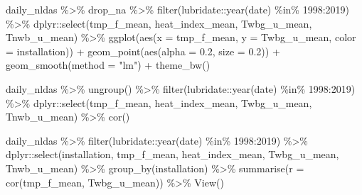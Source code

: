 \documentclass[
]{article}
\newenvironment{Shaded}{\begin{snugshade}}{\end{snugshade}}
\newcommand{\AttributeTok}[1]{\textcolor[rgb]{0.77,0.63,0.00}{#1}}
\newcommand{\DecValTok}[1]{\textcolor[rgb]{0.00,0.00,0.81}{#1}}
\newcommand{\FloatTok}[1]{\textcolor[rgb]{0.00,0.00,0.81}{#1}}
\newcommand{\FunctionTok}[1]{\textcolor[rgb]{0.00,0.00,0.00}{#1}}
\newcommand{\NormalTok}[1]{#1}
\newcommand{\SpecialCharTok}[1]{\textcolor[rgb]{0.00,0.00,0.00}{#1}}
\newcommand{\StringTok}[1]{\textcolor[rgb]{0.31,0.60,0.02}{#1}}
\begin{document}
\begin{Shaded}
\begin{Highlighting}[]
\NormalTok{daily\_nldas }\SpecialCharTok{\%\textgreater{}\%} 
\NormalTok{  drop\_na }\SpecialCharTok{\%\textgreater{}\%} 
  \FunctionTok{filter}\NormalTok{(lubridate}\SpecialCharTok{::}\FunctionTok{year}\NormalTok{(date) }\SpecialCharTok{\%in\%} \DecValTok{1998}\SpecialCharTok{:}\DecValTok{2019}\NormalTok{) }\SpecialCharTok{\%\textgreater{}\%} 
\NormalTok{  dplyr}\SpecialCharTok{::}\FunctionTok{select}\NormalTok{(tmp\_f\_mean, heat\_index\_mean, Twbg\_u\_mean, Tnwb\_u\_mean) }\SpecialCharTok{\%\textgreater{}\%} 
  \FunctionTok{ggplot}\NormalTok{(}\FunctionTok{aes}\NormalTok{(}\AttributeTok{x =}\NormalTok{ tmp\_f\_mean, }\AttributeTok{y =}\NormalTok{ Twbg\_u\_mean, }\AttributeTok{color =}\NormalTok{ installation)) }\SpecialCharTok{+}
    \FunctionTok{geom\_point}\NormalTok{(}\FunctionTok{aes}\NormalTok{(}\AttributeTok{alpha =} \FloatTok{0.2}\NormalTok{, }\AttributeTok{size =} \FloatTok{0.2}\NormalTok{)) }\SpecialCharTok{+}
    \FunctionTok{geom\_smooth}\NormalTok{(}\AttributeTok{method =} \StringTok{"lm"}\NormalTok{) }\SpecialCharTok{+}
    \FunctionTok{theme\_bw}\NormalTok{()}



\NormalTok{daily\_nldas }\SpecialCharTok{\%\textgreater{}\%} 
  \FunctionTok{ungroup}\NormalTok{() }\SpecialCharTok{\%\textgreater{}\%} 
  \FunctionTok{filter}\NormalTok{(lubridate}\SpecialCharTok{::}\FunctionTok{year}\NormalTok{(date) }\SpecialCharTok{\%in\%} \DecValTok{1998}\SpecialCharTok{:}\DecValTok{2019}\NormalTok{) }\SpecialCharTok{\%\textgreater{}\%} 
\NormalTok{  dplyr}\SpecialCharTok{::}\FunctionTok{select}\NormalTok{(tmp\_f\_mean, heat\_index\_mean, Twbg\_u\_mean, Tnwb\_u\_mean) }\SpecialCharTok{\%\textgreater{}\%} 
  \FunctionTok{cor}\NormalTok{()}


\NormalTok{daily\_nldas }\SpecialCharTok{\%\textgreater{}\%} 
  \FunctionTok{filter}\NormalTok{(lubridate}\SpecialCharTok{::}\FunctionTok{year}\NormalTok{(date) }\SpecialCharTok{\%in\%} \DecValTok{1998}\SpecialCharTok{:}\DecValTok{2019}\NormalTok{) }\SpecialCharTok{\%\textgreater{}\%} 
\NormalTok{  dplyr}\SpecialCharTok{::}\FunctionTok{select}\NormalTok{(installation, tmp\_f\_mean, heat\_index\_mean, Twbg\_u\_mean, Tnwb\_u\_mean) }\SpecialCharTok{\%\textgreater{}\%} 
  \FunctionTok{group\_by}\NormalTok{(installation) }\SpecialCharTok{\%\textgreater{}\%} 
    \FunctionTok{summarise}\NormalTok{(}\AttributeTok{r =} \FunctionTok{cor}\NormalTok{(tmp\_f\_mean, Twbg\_u\_mean)) }\SpecialCharTok{\%\textgreater{}\%} \FunctionTok{View}\NormalTok{()}
\end{Highlighting}
\end{Shaded}
\end{document}
